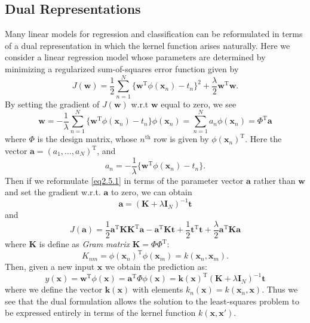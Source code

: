 \documentclass[a4paper]{book}
\newcommand{\mrm}{\mathrm}
\newcommand{\mbf}{\mathbf}
\newcommand{\KK}{\mbf K}
\newcommand{\II}{\mbf I}
\newcommand{\ww}{\mbf w}
\newcommand{\ttt}{\mbf t}
\newcommand{\xx}{\mbf x}
\newcommand{\rev}{^{-1}}
\newcommand{\trans}{^{\mrm T}}
\begin{document}
\subsection{Dual Representations}
Many linear models for regression and classification can be reformulated in terms of a dual representation in which the kernel function arises naturally. Here we consider a linear regression model whose parameters are determined by minimizing a regularized sum-of-squares error function given by
\begin{equation}\label{eq2.5.1}
  J(\ww) = \frac12\sum_{n=1}^{N}\{\ww\trans\phi(\xx_n)-t_n\}^2 +\frac\lambda2\ww\trans\ww.
\end{equation}
By setting the gradient of $J(\ww)$ w.r.t $\ww$ equal to zero, we see
\begin{equation}\label{}
  \ww = -\frac{1}{\lambda}\sum_{n=1}^{N}\{\ww\trans\phi(\xx_n)-t_n\}\phi(\xx_n)=\sum_{n=1}^{N}a_n\phi(\xx_n)=\Phi\trans\mbf a
\end{equation}
where $\Phi$ is the design matrix, whose $n^{\mrm{th}}$ row is given by $\phi(\xx_n)\trans$. Here the vector $\mbf a = (a_1,\dots,a_N)\trans$, and
\begin{equation}\label{}
  a_n = -\frac1\lambda \{\ww\trans\phi(\xx_n)-t_n\}.
\end{equation}
Then if we reformulate \ref{eq2.5.1} in terms of the parameter vector $\mbf a$ rather than $\ww$ and set the gradient w.r.t. $\mbf a$ to zero, we can obtain
\begin{equation}\label{}
  \mbf a= (\KK +\lambda \II_N)\rev\ttt
\end{equation}
and
\begin{equation}\label{}
  J(\mbf a) = \frac12\mbf a\trans\KK\KK\trans\mbf a-\mbf a\trans\KK\ttt+\frac12\ttt\trans\ttt+\frac{\lambda}{2}\mbf a\trans\KK\mbf a
\end{equation}
where $\KK$ is define as \textit{Gram matrix} $\KK=\Phi\Phi\trans$:
\begin{equation}\label{}
  K_{nm} = \phi(\xx_n)\trans\phi(\xx_m)=k(\xx_n,\xx_m).
\end{equation}
Then, given a new input $\xx$ we obtain the prediction as:
\begin{equation}\label{}
  y(\xx)=\ww\trans\phi(\xx)=\mbf a\trans\Phi\phi(\xx)= \mbf k(\xx)\trans(\KK+\lambda \II_N)\rev\ttt
\end{equation}
where we define the vector $\mbf k(\xx)$ with elements $k_n(\xx) = k(\xx_n,\xx)$. Thus we see that the dual formulation allows the solution to the least-squares problem to be
expressed entirely in terms of the kernel function $k(\xx, \xx')$.
\end{document}
